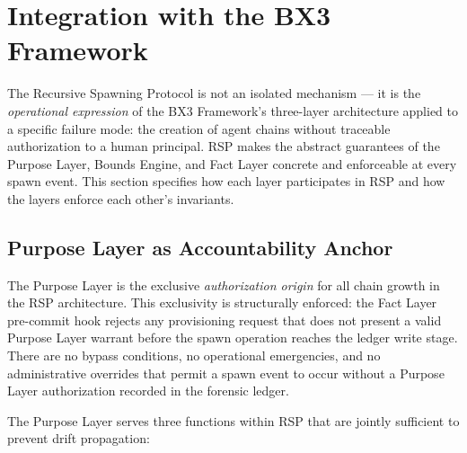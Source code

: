 \section{Integration with the BX3 Framework}
\label{sec:rs-integration}

The Recursive Spawning Protocol is not an isolated mechanism — it is the \emph{operational expression} of the BX3 Framework's three-layer architecture applied to a specific failure mode: the creation of agent chains without traceable authorization to a human principal. RSP makes the abstract guarantees of the Purpose Layer, Bounds Engine, and Fact Layer concrete and enforceable at every spawn event. This section specifies how each layer participates in RSP and how the layers enforce each other's invariants.

\subsection{Purpose Layer as Accountability Anchor}
\label{sec:rs-purpose-layer-anchor}

The Purpose Layer is the exclusive \emph{authorization origin} for all chain growth in the RSP architecture. This exclusivity is structurally enforced: the Fact Layer pre-commit hook rejects any provisioning request that does not present a valid Purpose Layer warrant before the spawn operation reaches the ledger write stage. There are no bypass conditions, no operational emergencies, and no administrative overrides that permit a spawn event to occur without a Purpose Layer authorization recorded in the forensic ledger.

The Purpose Layer serves three functions within RSP that are jointly sufficient to prevent drift propagation:

